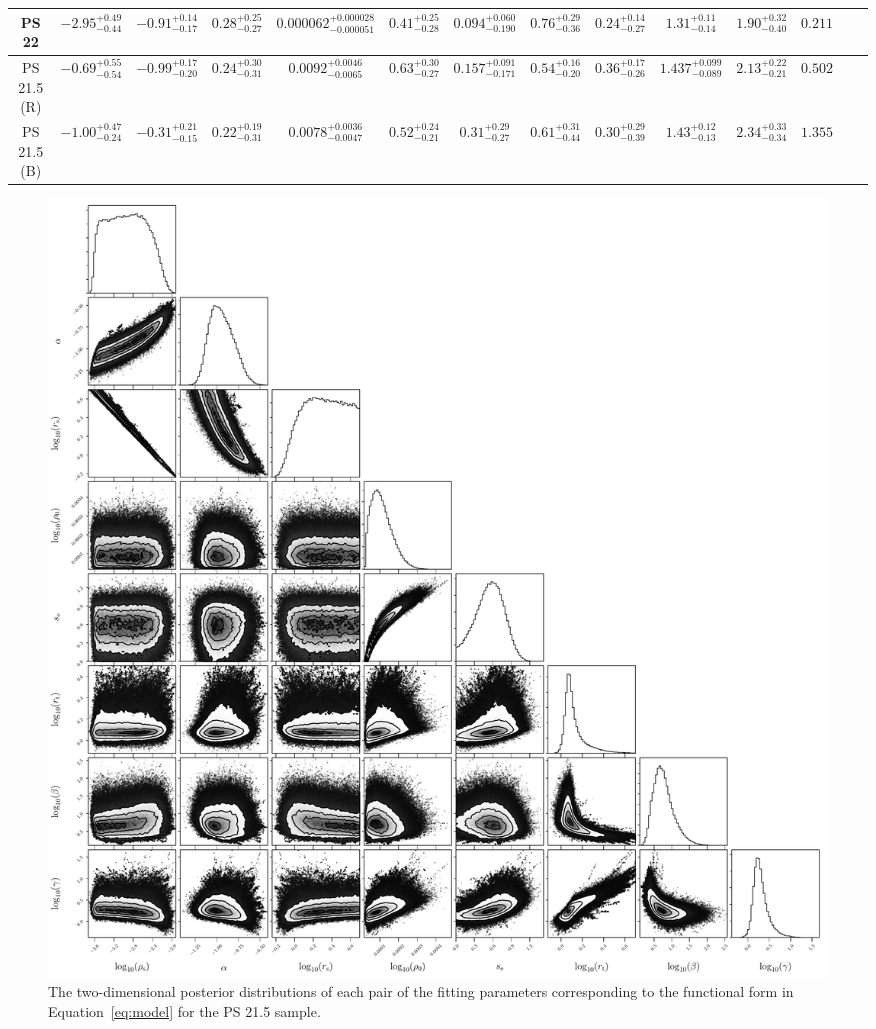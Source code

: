 \documentclass[iop, apjl, twocolappendix, numberedappendix]{emulateapj}
\begin{document}
\begin{table}
\begin{tabular}{cccccccccccccc}
\hline
PS 22 & $-2.95_{-0.44}^{+0.49}$ & $-0.91_{-0.17}^{+0.14}$ & $0.28_{-0.27}^{+0.25}$ & $0.000062_{-0.000051}^{+0.000028}$ & $0.41_{-0.28}^{+0.25}$ & $0.094_{-0.190}^{+0.060}$ & $0.76_{-0.36}^{+0.29}$ & $0.24_{-0.27}^{+0.14}$ &$1.31_{-0.14}^{+0.11}$&$1.90_{-0.40}^{+0.32} $&$0.211$ \\
\hline
PS 21.5 (R) & $-0.69_{-0.54}^{+0.55}$ & $-0.99_{-0.20}^{+0.17}$ & $0.24_{-0.31}^{+0.30}$ & $0.0092_{-0.0065}^{+0.0046}$ & $0.63_{-0.27}^{+0.30}$ & $0.157_{-0.171}^{+0.091}$ & $0.54_{-0.20}^{+0.16}$ & $0.36_{-0.26}^{+0.17}$ & $1.437_{-0.089}^{+0.099}$ & $2.13_{-0.21}^{+0.22}$ & $0.502$ \\
\hline
PS 21.5 (B) & $-1.00_{-0.24}^{+0.47}$ & $-0.31_{-0.15}^{+0.21}$ & $0.22_{-0.31}^{+0.19}$ & $0.0078_{-0.0047}^{+0.0036}$ & $0.52_{-0.21}^{+0.24}$ & $0.31_{-0.27}^{+0.29}$ & $0.61_{-0.44}^{+0.31}$ & $0.30_{-0.39}^{+0.29}$ & $1.43_{-0.13}^{+0.12}$ & $2.34_{-0.34}^{+0.33}$ & $1.355$ \\
\hline
    \end{tabular} 
\end{table}

\begin{figure}
    \includegraphics[width= \textwidth]{corner215.pdf}
\caption{The two-dimensional posterior distributions of each pair of
the fitting parameters corresponding to the functional
form in Equation~\ref{eq:model} for the PS 21.5 sample.
}
   \label{fig:corner_21.5} 
\end{figure}
\end{document}
